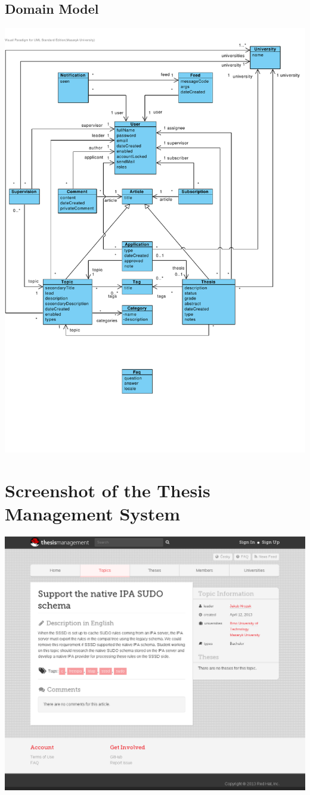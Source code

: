 \documentclass[11pt,oneside]{fithesis2}
\begin{document}
\section{Domain Model}
\includegraphics[keepaspectratio, trim=0 100 10 30, clip, width=\textwidth]{./images/domain-model.pdf}

\chapter{Screenshot of the Thesis Management System}
\includegraphics[keepaspectratio, width=\textwidth]{./images/tms-screenshot.png}
\end{document}
